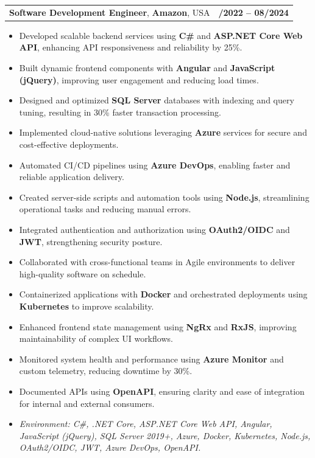 \documentclass[letterpaper,11pt]{article}
\makeatletter
\newcommand{\resumeItem}[1]{
  \item\footnotesize{
    {#1 \vspace{-2pt}}
  }
}
\newcommand{\resumeSubheading}[4]{
  \vspace{-2pt}\item
    \begin{tabular*}{1.0\textwidth}[t]{l@{\extracolsep{\fill}}r}
      \textbf{\fontsize{10pt}{14pt}\selectfont #3}, \textbf{\fontsize{10pt}{14pt}\selectfont #1}, \fontsize{10pt}{14pt}\selectfont #4 & \textbf{\fontsize{10pt}{14pt}\selectfont #2} \\
    \end{tabular*}\vspace{-7pt}
}
\newcommand{\resumeItemListStart}{\begin{itemize}[leftmargin=*]}
\newcommand{\resumeItemListEnd}{\end{itemize}\vspace{-5pt}}
\makeatother
\begin{document}
\resumeSubheading
{Amazon}{10/2022 -- 08/2024}
{Software Development Engineer}{USA}
\resumeItemListStart
  \resumeItem{Developed scalable backend services using \textbf{C\#} and \textbf{ASP.NET Core Web API}, enhancing API responsiveness and reliability by 25\%.}
  \resumeItem{Built dynamic frontend components with \textbf{Angular} and \textbf{JavaScript (jQuery)}, improving user engagement and reducing load times.}
  \resumeItem{Designed and optimized \textbf{SQL Server} databases with indexing and query tuning, resulting in 30\% faster transaction processing.}
  \resumeItem{Implemented cloud-native solutions leveraging \textbf{Azure} services for secure and cost-effective deployments.}
  \resumeItem{Automated CI/CD pipelines using \textbf{Azure DevOps}, enabling faster and reliable application delivery.}
  \resumeItem{Created server-side scripts and automation tools using \textbf{Node.js}, streamlining operational tasks and reducing manual errors.}
  \resumeItem{Integrated authentication and authorization using \textbf{OAuth2/OIDC} and \textbf{JWT}, strengthening security posture.}
  \resumeItem{Collaborated with cross-functional teams in Agile environments to deliver high-quality software on schedule.}
  \resumeItem{Containerized applications with \textbf{Docker} and orchestrated deployments using \textbf{Kubernetes} to improve scalability.}
  \resumeItem{Enhanced frontend state management using \textbf{NgRx} and \textbf{RxJS}, improving maintainability of complex UI workflows.}
  \resumeItem{Monitored system health and performance using \textbf{Azure Monitor} and custom telemetry, reducing downtime by 30\%.}
  \resumeItem{Documented APIs using \textbf{OpenAPI}, ensuring clarity and ease of integration for internal and external consumers.}
  \resumeItem{\textit{Environment: C\#, .NET Core, ASP.NET Core Web API, Angular, JavaScript (jQuery), SQL Server 2019+, Azure, Docker, Kubernetes, Node.js, OAuth2/OIDC, JWT, Azure DevOps, OpenAPI.}}
\resumeItemListEnd
\end{document}
